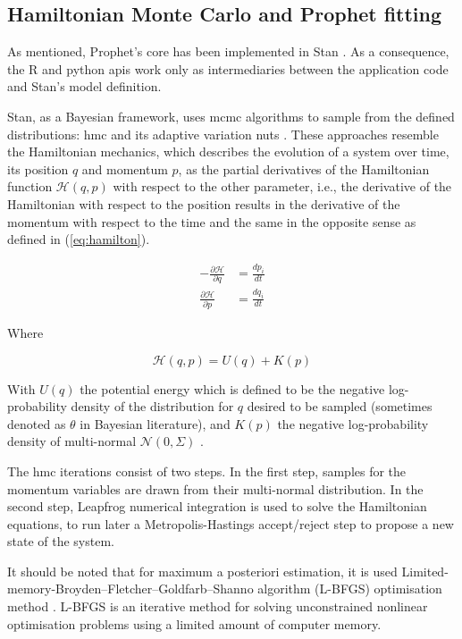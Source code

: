 


\subsection{Hamiltonian Monte Carlo and Prophet fitting}

As mentioned, Prophet's core has been implemented in Stan \cite{carpenter2017stan}. As a consequence, the R and python \acp{api} work only as intermediaries between the application code and Stan's model definition. 

Stan, as a Bayesian framework, uses \ac{mcmc} algorithms to sample from the defined distributions: \ac{hmc} \cite{betancourt2018conceptual} and its adaptive variation \ac{nuts} \cite{hoffman2014no}. These approaches resemble the Hamiltonian mechanics, which describes the evolution of a system over time, its position $q$ and momentum $p$, as the partial derivatives of the Hamiltonian function $\mathcal{H}(q,p)$ with respect to the other parameter, i.e., the derivative of the Hamiltonian with respect to the position results in the derivative of the momentum with respect to the time and the same in the opposite sense as defined in (\ref{eq:hamilton}).

\begin{align}
	\label{eq:hamilton}
	-\frac{\partial\mathcal{H}}{\partial q} &= \frac{dp_i}{dt} \\
	\frac{\partial\mathcal{H}}{\partial p} &= \frac{dq_i}{dt}
\end{align}

Where 

\begin{equation}
	\mathcal{H}(q,p) = U(q) + K(p) 
\end{equation}


With $U(q)$ the potential energy which is defined to be the negative log-probability density of the distribution for $q$ desired to be sampled (sometimes denoted as $\theta$ in Bayesian literature), and $K(p)$ the negative log-probability density of multi-normal $\mathcal{N}(0,\Sigma)$ \cite{neal2011mcmc}.

The \ac{hmc} iterations consist of two steps. In the first step, samples for the momentum variables are drawn from their multi-normal distribution. In the second step, Leapfrog numerical integration \cite{cuendet2007calculation} is used to solve the Hamiltonian equations, to run later a Metropolis-Hastings accept/reject step to propose a new state of the system.

It should be noted that for maximum a posteriori estimation, it is used Limited-memory-Broyden–Fletcher–Goldfarb–Shanno algorithm (L-BFGS) optimisation method \cite{fletcher1987}. L-BFGS is an iterative method for solving unconstrained nonlinear optimisation problems using a limited amount of computer memory.